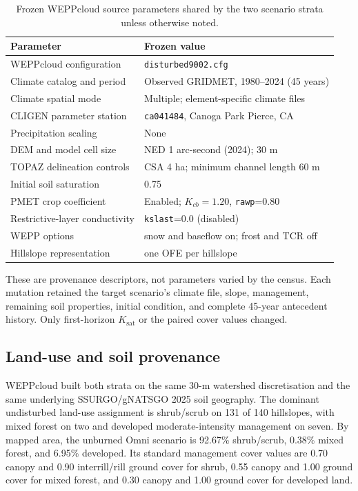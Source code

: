 \documentclass[11pt]{article}
\newcommand{\Ksat}{\ensuremath{K_{\mathrm{sat}}}}
\begin{document}
\begin{table}[H]
  \centering
  \caption{Frozen WEPPcloud source parameters shared by the two scenario
  strata unless otherwise noted.}
  \label{tab:weppcloud-parameters}
  \begin{tabular}{ll}
    \toprule
    Parameter & Frozen value \\
    \midrule
    WEPPcloud configuration & \texttt{disturbed9002.cfg} \\
    Climate catalog and period & Observed GRIDMET, 1980--2024 (45 years) \\
    Climate spatial mode & Multiple; element-specific climate files \\
    CLIGEN parameter station & \texttt{ca041484}, Canoga Park Pierce, CA \\
    Precipitation scaling & None \\
    DEM and model cell size & NED 1 arc-second (2024); 30 m \\
    TOPAZ delineation controls & CSA 4 ha; minimum channel length 60 m \\
    Initial soil saturation & 0.75 \\
    PMET crop coefficient & Enabled; \(K_{cb}=1.20\), \texttt{rawp}=0.80 \\
    Restrictive-layer conductivity & \texttt{kslast}=0.0 (disabled) \\
    WEPP options & snow and baseflow on; frost and TCR off \\
    Hillslope representation & one OFE per hillslope \\
    \bottomrule
  \end{tabular}
\end{table}

These are provenance descriptors, not parameters varied by the census. Each
mutation retained the target scenario's climate file, slope, management,
remaining soil properties, initial condition, and complete 45-year antecedent
history. Only first-horizon \Ksat{} or the paired cover values changed.

\subsection{Land-use and soil provenance}

WEPPcloud built both strata on the same 30-m watershed discretisation and the
same underlying SSURGO/gNATSGO 2025 soil geography. The dominant undisturbed
land-use assignment is shrub/scrub on 131 of 140 hillslopes, with mixed forest
on two and developed moderate-intensity management on seven. By mapped area,
the unburned Omni scenario is 92.67\% shrub/scrub, 0.38\% mixed forest, and
6.95\% developed. Its standard management cover values are 0.70 canopy and
0.90 interrill/rill ground cover for shrub, 0.55 canopy and 1.00 ground cover
for mixed forest, and 0.30 canopy and 1.00 ground cover for developed land.
\end{document}
